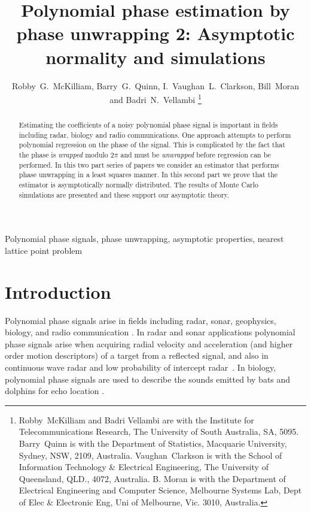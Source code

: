 \documentclass[journal]{IEEEtran}
\title{Polynomial phase estimation by phase unwrapping 2: Asymptotic normality and simulations}
\author{Robby~G.~McKilliam, Barry~G.~Quinn, I.~Vaughan~L.~Clarkson, Bill~Moran and Badri~N.~Vellambi%
    \thanks{%
Robby~McKilliam and Badri Vellambi are with the Institute for Telecommunications Research, The University of South Australia, SA, 5095.  Barry~Quinn is with the Department of Statistics, Macquarie University, Sydney, NSW, 2109, Australia.   Vaughan~Clarkson is with the School of Information Technology \& Electrical Engineering, The University of Queensland, QLD., 4072, Australia.  B. Moran is with the Department of Electrical Engineering and Computer
Science, Melbourne Systems Lab, Dept of Elec \& Electronic Eng, Uni of Melbourne, Vic. 3010, Australia.}}
\begin{document}
 
\maketitle

\begin{abstract}
Estimating the coefficients of a noisy polynomial phase signal is important in fields including radar, biology and radio communications. One approach attempts to perform polynomial regression on the phase of the signal.  This is complicated by the fact that the phase is \emph{wrapped} modulo $2\pi$ and must be \emph{unwrapped} before regression can be performed. %
In this two part series of papers we consider an estimator that performs phase unwrapping in a least squares manner.  In this second part we prove that the estimator is asymptotically normally distributed.  The results of Monte Carlo simulations are presented and these support our asymptotic theory.
\end{abstract}

\begin{keywords}
Polynomial phase signals, phase unwrapping, asymptotic properties, nearest lattice point problem
\end{keywords}
 
%

\section{Introduction} \label{intro}

Polynomial phase signals arise in fields including radar, sonar, geophysics, biology, and radio communication \cite{Angeby_estimating_2000}. In radar and sonar applications polynomial phase signals arise when acquiring radial velocity and acceleration (and higher order motion descriptors) of a target from a reflected signal, and also in continuous wave radar and low probability of intercept radar~\cite{Levanon_Radar_signals_2004}.  In biology, polynomial phase signals are used to describe the sounds emitted by bats and dolphins for echo location \citep{Suga_1975_bats_echolocation, Moss_2005echolocation}.  
\end{document}
